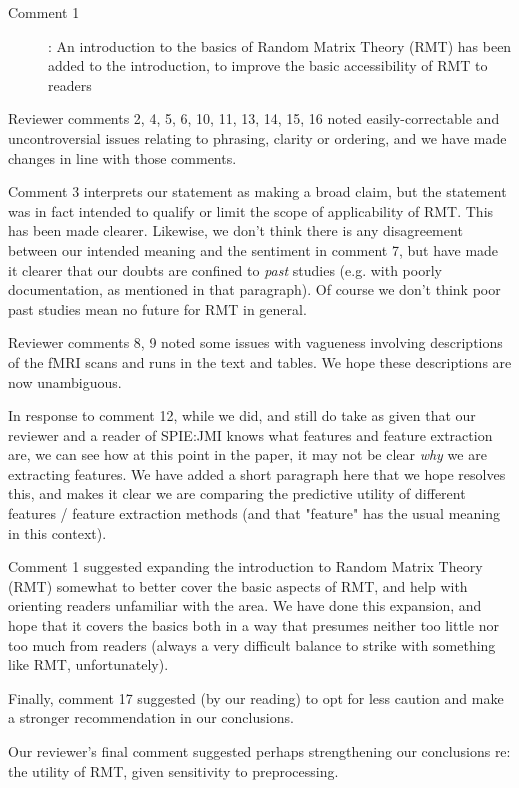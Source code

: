 \documentclass[10pt,letter]{article}
\begin{document}
\begin{description}
\item[Comment 1]: An introduction to the basics of Random Matrix Theory (RMT) has been
added to the introduction, to improve the basic accessibility of RMT to readers
\end{description}


Reviewer comments 2, 4, 5, 6, 10, 11, 13, 14, 15, 16 noted easily-correctable
and uncontroversial issues relating to phrasing, clarity or ordering, and we
have made changes in line with those comments.

Comment 3 interprets our statement as making a broad claim, but the statement was
in fact intended to qualify or limit the scope of applicability of RMT. This has been
made clearer. Likewise, we don't think there is any disagreement between our
intended meaning and the sentiment in comment 7, but have made it clearer that
our doubts are confined to \textit{past} studies (e.g. with poorly documentation,
as mentioned in that paragraph). Of course we don't think poor past studies mean no
future for RMT in general.


Reviewer comments 8, 9 noted some issues with vagueness involving descriptions
of the fMRI scans and runs in the text and tables. We hope these descriptions are now
unambiguous.

In response to comment 12, while we did, and still do take as given that our
reviewer and a reader of SPIE:JMI knows what features and feature extraction
are, we can see how at this point in the paper, it may not be clear
\textit{why} we are extracting features. We have added a short paragraph here
that we hope resolves this, and makes it clear we are comparing the predictive
utility of different features / feature extraction methods (and that "feature"
has the usual meaning in this context).



Comment 1 suggested expanding the introduction to Random Matrix Theory (RMT)
somewhat to better cover the basic aspects of RMT, and help with orienting
readers unfamiliar with the area. We have done this expansion, and hope that it
covers the basics both in a way that presumes neither too little nor too much
from readers (always a very difficult balance to strike with something like
RMT, unfortunately).

Finally, comment 17 suggested (by our reading) to opt for less caution and make
a stronger recommendation in our conclusions.


Our reviewer's final comment suggested perhaps strengthening our conclusions
re: the utility of RMT, given sensitivity to preprocessing.
\end{document}
